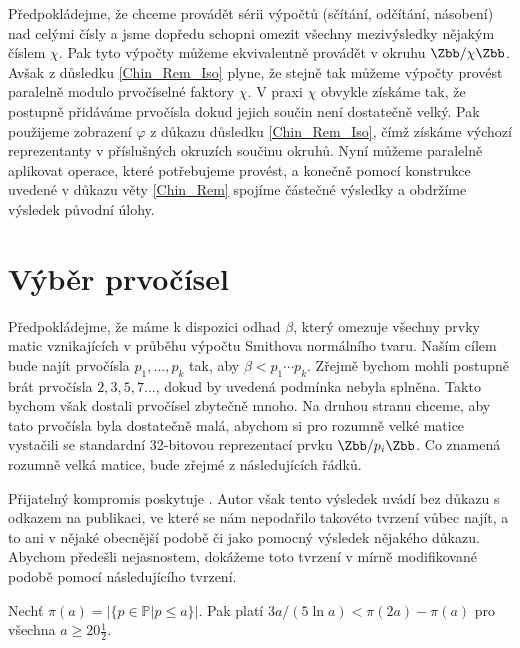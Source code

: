 Předpokládejme, že chceme provádět sérii výpočtů (sčítání, odčítání,
násobení) nad celými čísly a jsme dopředu schopni omezit všechny mezivýsledky nějakým číslem
$ \chi $. Pak tyto výpočty můžeme ekvivalentně provádět v okruhu $ \Zbb / \chi \Zbb $.
Avšak z důsledku \ref{Chin_Rem_Iso} plyne, že stejně tak můžeme výpočty provést
paralelně modulo prvočíselné faktory $ \chi $. V praxi $ \chi $ obvykle získáme tak,
že postupně přidáváme prvočísla dokud jejich součin není dostatečně velký.
Pak použijeme zobrazení $ \varphi $ z důkazu důsledku \ref{Chin_Rem_Iso},
čímž získáme výchozí reprezentanty v příslušných okruzích součinu okruhů.
Nyní můžeme paralelně aplikovat operace, které potřebujeme provést, a konečně
pomocí konstrukce uvedené v důkazu věty \ref{Chin_Rem} spojíme částečné výsledky
a obdržíme výsledek původní úlohy.




\section{Výběr prvočísel}
Předpokládejme, že máme k dispozici odhad $ \beta $, který omezuje všechny
prvky matic vznikajících v průběhu výpočtu Smithova normálního tvaru. Naším cílem bude
najít prvočísla $ p_1,\dots, p_k $ tak, aby $ \beta < p_1 \cdots p_k $. Zřejmě
bychom mohli postupně brát prvočísla $ 2, 3, 5, 7 \dots $, dokud by uvedená
podmínka nebyla splněna. Takto bychom však dostali prvočísel zbytečně mnoho. Na
druhou stranu chceme, aby tato prvočísla byla dostatečně malá, abychom
si pro rozumně velké matice vystačili se standardní 32-bitovou reprezentací
prvku $ \Zbb / p_i \Zbb $. Co znamená rozumně velká matice, bude zřejmé z 
následujících řádků.

Přijatelný kompromis poskytuje \cite[Lemma 14]{triang}. Autor však tento výsledek
uvádí bez důkazu s odkazem na publikaci, ve které se nám nepodařilo takovéto
tvrzení vůbec najít, a to ani v nějaké obecnější podobě či jako pomocný výsledek
nějakého důkazu. Abychom předešli nejasnostem, dokážeme toto tvrzení v mírně
modifikované podobě pomocí následujícího tvrzení.


\begin{lem} \label{num_primes_src}
Nechť $ \pi(a) = \left\vert \{ p \in \mathbb{P} \vert p \leq a \} \right\vert $. Pak
platí $ 3a / (5 \ln{a}) < \pi(2a) - \pi(a) $ pro všechna $ a \geq 20 \frac{1}{2} $.
\end{lem}

